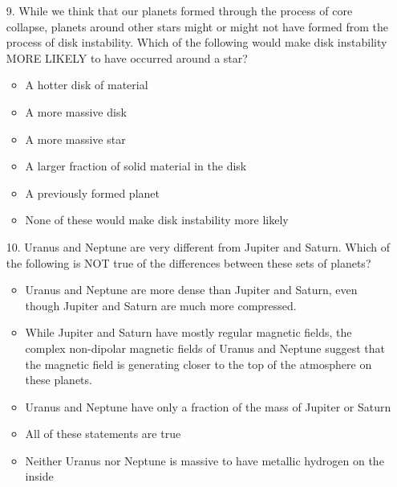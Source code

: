 \begin{enumerate}
\item[9.] While we think that our planets formed through the process of core collapse, planets around other stars might or might not have formed from the process of disk instability. Which of the following would make disk instability MORE LIKELY to have occurred around a star?
    \begin{multicols}{3}
    \begin{itemize}[label={$\bullet$}]
        \item A hotter  disk of material
        \item A more massive disk
        \item A more massive star
        \item A larger fraction of solid material in the disk
        \item A previously formed planet
        \item None of these would make disk instability more likely
    \end{itemize}
    \end{multicols}

\item[10.] Uranus and Neptune are very different from Jupiter and Saturn. Which of the following is NOT true of the differences between these sets of planets?
    \begin{multicols}{2}
    \begin{itemize}[label={$\bullet$}]
        \item Uranus and Neptune are more dense than Jupiter and Saturn, even though Jupiter and Saturn are much more compressed.
        \item While Jupiter and Saturn have mostly regular magnetic fields, the complex non-dipolar magnetic fields of Uranus and Neptune suggest that the magnetic field is generating closer to the top of the atmosphere on these planets.
        \item Uranus and Neptune have only a fraction of the mass of Jupiter or Saturn
        \item All of these statements are true
        \item Neither Uranus nor Neptune is massive to have metallic hydrogen on the inside
    \end{itemize}
    \end{multicols}                    
\end{enumerate}



\newpage 

